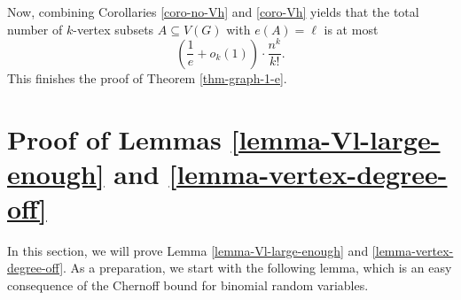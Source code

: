 Now, combining Corollaries \ref{coro-no-Vh} and \ref{coro-Vh} yields that the total number of $k$-vertex subsets $A\subseteq V(G)$ with $e(A)=\ell$ is at most
\[\left(\frac{1}{e}+o_k(1)\right)\cdot \frac{n^k}{k!}.\]
This finishes the proof of Theorem \ref{thm-graph-1-e}.

\section{Proof of Lemmas \ref{lemma-Vl-large-enough} and \ref{lemma-vertex-degree-off}}\label{sect-proofs-two-lemmas}

In this section, we will prove Lemma \ref{lemma-Vl-large-enough} and \ref{lemma-vertex-degree-off}. As a preparation, we start with the following lemma, which is an easy consequence of the Chernoff bound for binomial random variables.

